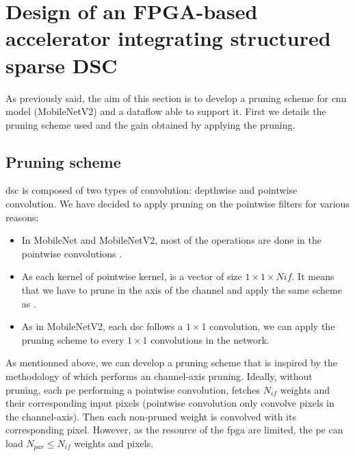 \section{Design of an FPGA-based accelerator integrating structured sparse DSC} \label{sec:design}
As previously said,  the aim of this section is to develop a pruning scheme for \acrshort{cnn} model (MobileNetV2) and a dataflow able to support it. First we details the pruning scheme used and the gain obtained by applying the pruning. 
%
\subsection{Pruning scheme} \label{subsec:pscheme}
%
\acrshort{dsc} is composed of two types of convolution: depthwise and pointwise convolution. We have decided to apply pruning on the pointwise filters for various reasons:
%
\begin{itemize}
    \item In MobileNet and MobileNetV2, most of the operations are done in the pointwise convolutions \cite{zhang_channel_2019, tu_pruning_2019}.
    \item As each kernel of pointwise kernel, is a vector of size $1 \times 1  \times Nif$. It means that we have to prune in the axis of the channel and apply the same scheme as \textcite{kang_accelerator-aware_2020}.
    \item As in MobileNetV2, each \acrshort{dsc} follows a $1 \times 1$ convolution, we can apply the pruning scheme to every $1 \times 1$ convolutions in the network.
\end{itemize}
%
As mentionned above, we can develop a pruning scheme that is inspired by the methodology of \textcite{kang_accelerator-aware_2020} which performs an channel-axis pruning. Ideally, without pruning, each \acrshort{pe} performing a pointwise convolution, fetches $N_{if}$ weights and their corresponding input pixels (pointwise convolution only convolve pixels in the channel-axis). Then each non-pruned weight is convolved with its corresponding pixel. However, as the resource of the \acrshort{fpga} are limited, the \acrshort{pe} can load $N_{par} \leq N_{if}$ weights and pixels.


